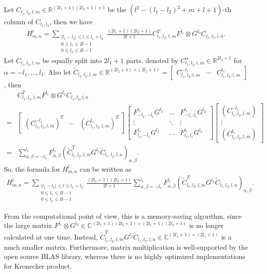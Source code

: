 \documentclass[12pt]{article}
\newcommand{\abs}[1]{\ensuremath{\left| #1 \right|}}
\newcommand{\real}{\ensuremath{\mathbb{R}}}
\begin{document}
Let $C_{l_1,l_2,l,m}\in\real^{(2l_1+1)(2l_2+1)\times 1}$ be the $(l^2-(l_1-l_2)^2 + m+l+1)$-th column of $C_{l_1,l_2}$, then we have
\begin{align*}
	H^l_{m,n} = \sum_{\substack{\abs{l_1-l_2} \leq l \leq l_1+l_2 \\ 0 \leq l_1 \leq B-1 \\ 0 \leq l_2 \leq B-1}} \frac{(2l_1+1)(2l_2+1)}{2l+1} C_{l_1,l_2,l,m}^T F^{l_1}\otimes G^{l_2} C_{l_1,l_2,l,n}.
\end{align*}
Let $C_{l_1,l_2,l,m}$ be equally split into $2l_1+1$ parts, denoted by $C_{l_1,l_2,l,m}^\alpha \in \real^{2l_2+1}$ for $\alpha = -l_1,\ldots,l_1$.
Also let $\tilde{C}_{l_1,l_2,l,m}\in\real^{(2l_2+1)\times(2l_1+1)} = \begin{bmatrix} C_{l_1,l_2,l,m}^{-l_1} & \cdots & C_{l_1,l_2,l,m}^{l_1} \end{bmatrix}$, then
\begin{align*}
	&C_{l_1,l_2,l,m}^T F^{l_1}\otimes G^{l_2} C_{l_1,l_2,l,n} \\
	= &\begin{bmatrix} (C_{l_1,l_2,l,m}^{-l_1})^T & \cdots & (C_{l_1,l_2,l,m}^{l_1})^T \end{bmatrix} \begin{bmatrix} F_{-l_1,-l_1}^{l_1}G^{l_2} & \ldots & F_{-l_1,l_1}^{l_1}G^{l_2} \\ \vdots & \ddots & \vdots \\ F_{l_1,-l_1}^{l_1}G^{l_2} & \ldots & F_{l_1,l_1}^{l_1}G^{l_2} \end{bmatrix} \begin{bmatrix} (C_{l_1,l_2,l,m}^{-l_1}) \\ \vdots \\ (C_{l_1,l_2,l,m}^{l_1}) \end{bmatrix} \\
	= &\sum_{\alpha,\beta=-l_1}^{l_1} F_{\alpha,\beta}^{l_1} \left( \tilde{C}_{l_1,l_2,l,m}^T G^{l_2} \tilde{C}_{l_1,l_2,l,n}\right)_{\alpha,\beta}.
\end{align*}
So, the formula for $H_{m,n}^l$ can be written as
\begin{align*}
	H^l_{m,n} = \sum_{\substack{\abs{l_1-l_2} \leq l \leq l_1+l_2 \\ 0 \leq l_1 \leq B-1 \\ 0 \leq l_2 \leq B-1}} \frac{(2l_1+1)(2l_2+1)}{2l+1} \sum_{\alpha,\beta=-l_1}^{l_1} F_{\alpha,\beta}^{l_1} \left( \tilde{C}_{l_1,l_2,l,m}^T G^{l_2} \tilde{C}_{l_1,l_2,l,n}\right)_{\alpha,\beta}.
\end{align*}

From the computational point of view, this is a memory-saving algorithm, since the large matrix $F^{l_1}\otimes G^{l_2} \in \mathbb{C}^{(2l_1+1)(2l_2+1) \times (2l_1+1)(2l_2+1)}$ is no longer calculated at one time.
Instead, $\tilde{C}_{l_1,l_2,l,m}^T G^{l_2} \tilde{C}_{l_1,l_2,l,n} \in \mathbb{C}^{(2l_1+1) \times (2l_1+1)}$ is a much smaller matrix.
Furthermore, matrix multiplication is well-supported by the open source BLAS library, whereas there is no highly optimized implementations for Kronecker product.
\end{document}

